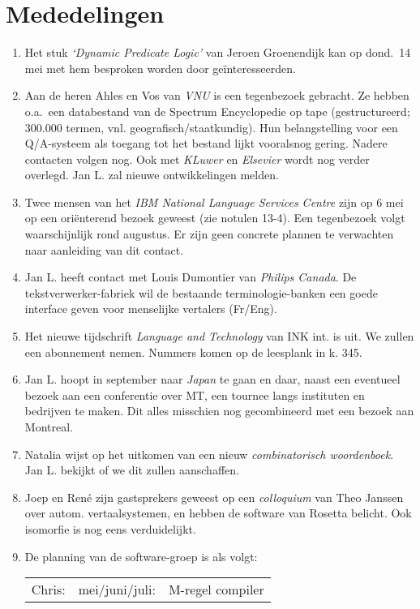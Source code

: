\section{Mededelingen}
\begin{enumerate}
  \item Het stuk {\em `Dynamic Predicate Logic'} van Jeroen Groenendijk kan op 
dond.\  14 mei met hem besproken worden door ge\"{i}nteresseerden.
  \item Aan de heren Ahles en Vos van {\em VNU} is een tegenbezoek 
gebracht. Ze hebben o.a.\  een databestand van de Spectrum Encyclopedie op tape 
(gestructureerd; 300.000 termen, vnl. geografisch/staatkundig). Hun 
belangstelling voor een Q/A-systeem als toegang tot het bestand lijkt 
vooralsnog ge\-ring. Nadere contacten volgen nog. Ook met {\em KLuwer} en {\em 
Elsevier} wordt nog verder overlegd. Jan L. zal nieuwe ontwikkelingen melden.
  \item Twee mensen van het {\em IBM National Language Services Centre} zijn op 
6 mei op een ori\"{e}nterend bezoek geweest (zie notulen 13-4). Een tegenbezoek 
volgt waarschijnlijk rond augustus. Er zijn geen concrete plannen te verwachten 
naar aanleiding van dit contact.
  \item Jan L. heeft contact met Louis Dumontier van {\em Philips Canada}. De 
tekst\-ver\-werker-fabriek wil de bestaande terminologie-banken een goede 
interface geven voor menselijke vertalers (Fr/Eng).
  \item Het nieuwe tijdschrift {\em Language and Technology} van INK int. is 
uit. We zullen een abonnement nemen. Nummers komen op de leesplank in k. 345.
  \item Jan L. hoopt in september naar {\em Japan} te gaan en daar, naast een 
eventueel bezoek aan een conferentie over MT, een tournee langs instituten 
en bedrijven te maken. Dit alles misschien nog gecombineerd met een bezoek aan 
Montreal.
  \item Natalia wijst op het uitkomen van een nieuw {\em combinatorisch 
woordenboek}. Jan L. bekijkt of we dit zullen aanschaffen.
  \item Joep en Ren\'{e} zijn gastsprekers geweest op een {\em colloquium} van 
Theo Janssen over autom. vertaalsystemen, en hebben de software van Rosetta 
belicht. Ook isomorfie is nog eens verduidelijkt.
  \item De planning van de software-groep is als volgt:\\
  \begin{tabular}{lll}
  Chris: & mei/juni/juli: & M-regel compiler\\

\end{tabular}
\end{enumerate}
